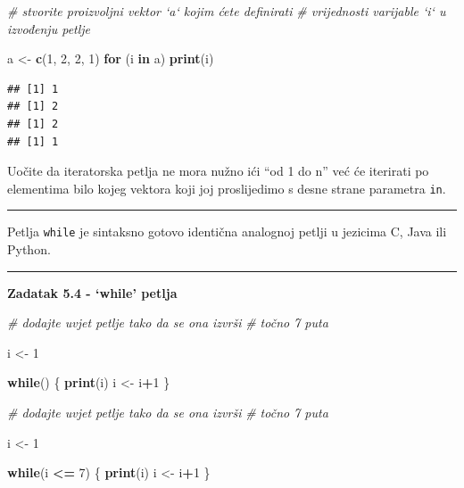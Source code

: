 \documentclass[]{book}
\newenvironment{Shaded}{\begin{snugshade}}{\end{snugshade}}
\newcommand{\KeywordTok}[1]{\textcolor[rgb]{0.13,0.29,0.53}{\textbf{#1}}}
\newcommand{\DecValTok}[1]{\textcolor[rgb]{0.00,0.00,0.81}{#1}}
\newcommand{\StringTok}[1]{\textcolor[rgb]{0.31,0.60,0.02}{#1}}
\newcommand{\CommentTok}[1]{\textcolor[rgb]{0.56,0.35,0.01}{\textit{#1}}}
\newcommand{\ControlFlowTok}[1]{\textcolor[rgb]{0.13,0.29,0.53}{\textbf{#1}}}
\newcommand{\OperatorTok}[1]{\textcolor[rgb]{0.81,0.36,0.00}{\textbf{#1}}}
\newcommand{\NormalTok}[1]{#1}
\theoremstyle{definition}
\theoremstyle{definition}
\theoremstyle{definition}
\theoremstyle{remark}
\begin{document}
\begin{Shaded}
\begin{Highlighting}[]
\CommentTok{# stvorite proizvoljni vektor `a` kojim ćete definirati}
\CommentTok{# vrijednosti varijable `i` u izvođenju petlje}

\NormalTok{a <-}\StringTok{ }\KeywordTok{c}\NormalTok{(}\DecValTok{1}\NormalTok{, }\DecValTok{2}\NormalTok{, }\DecValTok{2}\NormalTok{, }\DecValTok{1}\NormalTok{)}
\ControlFlowTok{for}\NormalTok{ (i }\ControlFlowTok{in}\NormalTok{ a) }\KeywordTok{print}\NormalTok{(i)    }
\end{Highlighting}
\end{Shaded}

\begin{verbatim}
## [1] 1
## [1] 2
## [1] 2
## [1] 1
\end{verbatim}

Uočite da iteratorska petlja ne mora nužno ići ``od 1 do n'' već će
iterirati po elementima bilo kojeg vektora koji joj proslijedimo s desne
strane parametra \texttt{in}.

\begin{center}\rule{0.5\linewidth}{\linethickness}\end{center}

Petlja \texttt{while} je sintaksno gotovo identična analognoj petlji u
jezicima C, Java ili Python.

\begin{center}\rule{0.5\linewidth}{\linethickness}\end{center}

\textbf{Zadatak 5.4 - `while' petlja}

\begin{Shaded}
\begin{Highlighting}[]
\CommentTok{# dodajte uvjet petlje tako da se ona izvrši}
\CommentTok{# točno 7 puta}

\NormalTok{i <-}\StringTok{ }\DecValTok{1}

\ControlFlowTok{while}\NormalTok{() \{}
  \KeywordTok{print}\NormalTok{(i)}
\NormalTok{  i <-}\StringTok{ }\NormalTok{i}\OperatorTok{+}\DecValTok{1}
\NormalTok{\}}
\end{Highlighting}
\end{Shaded}

\begin{Shaded}
\begin{Highlighting}[]
\CommentTok{# dodajte uvjet petlje tako da se ona izvrši}
\CommentTok{# točno 7 puta}

\NormalTok{i <-}\StringTok{ }\DecValTok{1}

\ControlFlowTok{while}\NormalTok{(i }\OperatorTok{<=}\StringTok{ }\DecValTok{7}\NormalTok{) \{}
  \KeywordTok{print}\NormalTok{(i)}
\NormalTok{  i <-}\StringTok{ }\NormalTok{i}\OperatorTok{+}\DecValTok{1}
\NormalTok{\}}
\end{Highlighting}
\end{Shaded}
\end{document}
